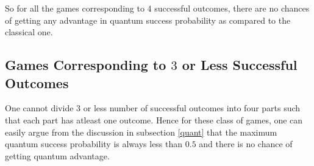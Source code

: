 \documentclass[]{svjour3}
\begin{document}
So for all the games corresponding to $4$ successful outcomes, there are no chances of getting any advantage in quantum success probability as compared to the classical one.



\subsection{Games Corresponding to $3$ or Less Successful Outcomes}


One cannot divide 3 or less number of successful  outcomes into four parts such that each part has atleast one outcome. Hence for these class of games, one can easily argue from the discussion in subsection \ref{quant} that the maximum quantum success probability is always less than $0.5$ and there is no chance of getting quantum advantage.
\end{document}

